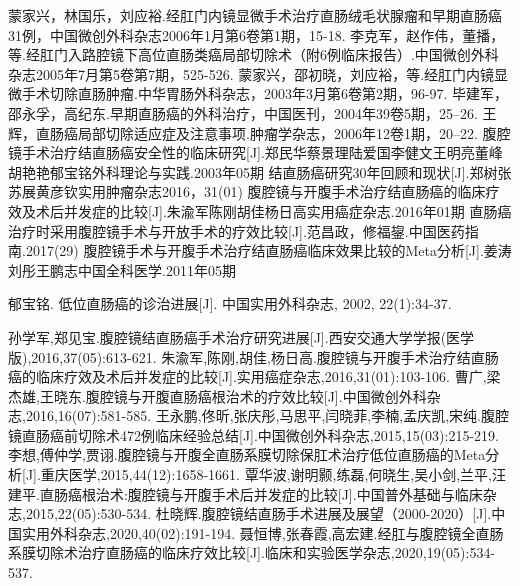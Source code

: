 \documentclass[a4paper,11pt,onecolumn,twoside]{article}
\begin{document}
\begin{multicols}{2}
\begin{thebibliography}{14}
        蒙家兴，林国乐，刘应裕.经肛门内镜显微手术治疗直肠绒毛状腺瘤和早期直肠癌31例，中国微创外科杂志2006年1月第6卷第1期，15-18.
        李克军，赵作伟，董播，等.经肛门入路腔镜下高位直肠类癌局部切除术（附6例临床报告）.中国微创外科杂志2005年7月第5卷第7期，525-526.
        蒙家兴，邵初晓，刘应裕，等.经肛门内镜显微手术切除直肠肿瘤.中华胃肠外科杂志，2003年3月第6卷第2期，96-97.
        毕建军，邵永孚，高纪东.早期直肠癌的外科治疗，中国医刊，2004年39卷5期，25--26.
        王辉，直肠癌局部切除适应症及注意事项.肿瘤学杂志，2006年12卷1期，20--22.
        腹腔镜手术治疗结直肠癌安全性的临床研究[J].郑民华蔡景理陆爱国李健文王明亮董峰胡艳艳郁宝铭外科理论与实践.2003年05期
        结直肠癌研究30年回顾和现状[J].郑树张苏展黄彦钦实用肿瘤杂志2016，31(01)
        腹腔镜与开腹手术治疗结直肠癌的临床疗效及术后并发症的比较[J].朱渝军陈刚胡佳杨日高实用癌症杂志.2016年01期
        直肠癌治疗时采用腹腔镜手术与开放手术的疗效比较[J].范昌政，修福鋆.中国医药指南.2017(29)
        腹腔镜手术与开腹手术治疗结直肠癌临床效果比较的Meta分析[J].姜涛刘彤王鹏志中国全科医学.2011年05期


        郁宝铭. 低位直肠癌的诊治进展[J]. 中国实用外科杂志, 2002, 22(1):34-37.

        孙学军,郑见宝.腹腔镜结直肠癌手术治疗研究进展[J].西安交通大学学报(医学版),2016,37(05):613-621.
        朱渝军,陈刚,胡佳,杨日高.腹腔镜与开腹手术治疗结直肠癌的临床疗效及术后并发症的比较[J].实用癌症杂志,2016,31(01):103-106.
        曹广,梁杰雄,王晓东.腹腔镜与开腹直肠癌根治术的疗效比较[J].中国微创外科杂志,2016,16(07):581-585.
        王永鹏,佟昕,张庆彤,马思平,闫晓菲,李楠,孟庆凯,宋纯.腹腔镜直肠癌前切除术472例临床经验总结[J].中国微创外科杂志,2015,15(03):215-219.
        李想,傅仲学,贾诩.腹腔镜与开腹全直肠系膜切除保肛术治疗低位直肠癌的Meta分析[J].重庆医学,2015,44(12):1658-1661.
        覃华波,谢明颢,练磊,何晓生,吴小剑,兰平,汪建平.直肠癌根治术:腹腔镜与开腹手术后并发症的比较[J].中国普外基础与临床杂志,2015,22(05):530-534.
        杜晓辉.腹腔镜结直肠手术进展及展望（2000-2020）[J].中国实用外科杂志,2020,40(02):191-194.
        聂恒博,张春霞,高宏建.经肛与腹腔镜全直肠系膜切除术治疗直肠癌的临床疗效比较[J].临床和实验医学杂志,2020,19(05):534-537.

    \end{thebibliography}
    \normalsize

\end{multicols}


\clearpage
\end{document}
